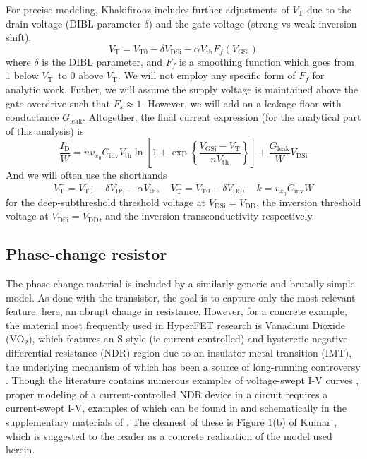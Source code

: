 \documentclass[letterpaper]{article}
\newcommand{\VT}{\ensuremath{V_\mathrm{T}}}
\newcommand{\VTO}{\ensuremath{V_\mathrm{T0}}}
\newcommand{\VTm}{\ensuremath{V_\mathrm{T}^-}}
\newcommand{\VTp}{\ensuremath{V_\mathrm{T}^+}}
\newcommand{\VDD}{\ensuremath{V_\mathrm{DD}}}
\newcommand{\Vth}{\ensuremath{V_\mathrm{th}}}
\newcommand{\VGSi}{\ensuremath{V_\mathrm{GSi}}}
\newcommand{\VDS}{\ensuremath{V_\mathrm{DS}}}
\newcommand{\VDSi}{\ensuremath{V_\mathrm{DSi}}}
\newcommand{\ID}{\ensuremath{I_\mathrm{D}}}
\begin{document}
For precise modeling, Khakifirooz includes further adjustments of $\VT$ due to the drain voltage (DIBL parameter $\delta$) and the gate voltage (strong vs weak inversion shift), 
\begin{equation}
  \VT=\VTO-\delta \VDSi-\alpha \Vth F_f(\VGSi)
  \label{eq:DIBL}
\end{equation}
where $\delta$ is the DIBL parameter, and $F_f$ is a smoothing function which goes from 1 below \VT\ to 0 above \VT.  We will not employ any specific form of $F_f$ for analytic work.  Futher, we will  assume the supply voltage is maintained above the gate overdrive such that $F_s\approx 1$. However, we will add on a leakage floor with conductance $G_\mathrm{leak}$.  Altogether, the final current expression (for the analytical part of this analysis) is
\begin{equation}
\frac{\ID}{W}=nv_{x_0}C_\mathrm{inv}\Vth \ln\left[1+\exp\left\{\frac{\VGSi-\VT}{n\Vth }\right\}\right]+\frac{G_\mathrm{leak}}{W}V_\mathrm{DSi}\label{eq:transistor_iv}
\end{equation}
And we will often use the shorthands
\begin{equation}
  \VTm=\VTO-\delta\VDS-\alpha\Vth, \quad
  \VTp=\VTO-\delta\VDS, \quad
  k=v_{x_0}C_\mathrm{inv}W
  \label{eq:short}
\end{equation}
for the deep-subthreshold threshold voltage at $\VDSi=\VDD$, the inversion threshold voltage at $\VDSi=\VDD$, and the inversion transconductivity respectively.
\subsection{Phase-change resistor}
\label{ss:PCR}
The phase-change material is included by a similarly generic and brutally simple model.  As done with the transistor, the goal is to capture only the most relevant feature: here, an abrupt change in resistance.  However, for a concrete example, the material most frequently used in HyperFET research \cite{Pergament_2013,Shukla_2015} is Vanadium Dioxide (VO$_2$), which features an S-style (ie current-controlled) and hysteretic negative differential resistance (NDR) region \cite{Pergament_arxiv2016,Zimmers_2013} due to an insulator-metal transition (IMT), the underlying mechanism of which has been a source of long-running controversy \cite{Pergament_2013}.  Though the literature contains numerous examples of voltage-swept I-V curves \cite{Shukla_2015,Zimmers_2013,Radu_2015,Yoon_2014}, proper modeling of a current-controlled NDR device in a circuit requires a current-swept I-V, examples of which can be found in \cite{Zimmers_2013,Kumar_2013,Pergament_arxiv2016} and schematically in the supplementary materials of \cite{Shukla_2015}.  The cleanest of these is Figure 1(b) of Kumar \cite{Kumar_2013}, which is suggested to the reader as a concrete realization of the model used herein.
\end{document}
